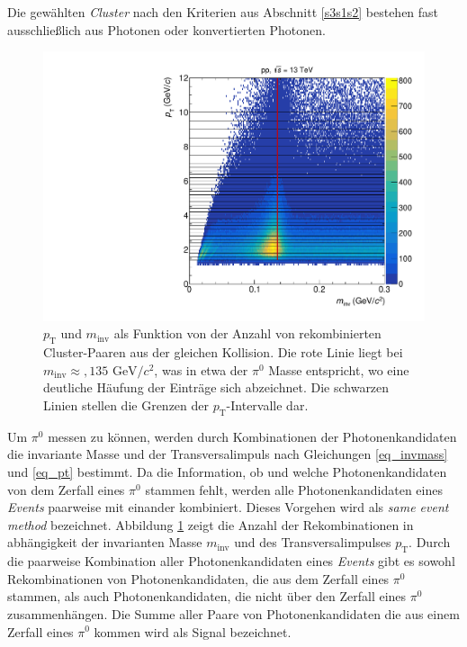 Die gew\"ahlten \textit{Cluster} nach den Kriterien aus Abschnitt \ref{s3s1s2} bestehen fast ausschlie{\ss}lich aus Photonen oder konvertierten Photonen.
\newline
\begin{figure}[tp]
\centering
\includegraphics[width=.7\linewidth]{hInvMass_pT_Signal.pdf}
\caption{$p_\text{T}$ und $m_\text{inv}$ als Funktion von der Anzahl von rekombinierten  Cluster-Paaren aus der gleichen Kollision.
Die rote Linie liegt bei $m_{\text{inv}}\approx,135\text{ GeV/}c^{2}$, was in etwa der $\pi^{0}$ Masse entspricht, wo eine deutliche H\"aufung der Eintr\"age sich abzeichnet.
Die schwarzen Linien stellen die Grenzen der $p_{\text{T}}$-Intervalle dar.}
\label{figInvMassPt_a}
\end{figure}
Um $\pi^{0}$ messen zu k\"onnen, werden durch Kombinationen der Photonenkandidaten die invariante Masse und der Transversalimpuls nach Gleichungen \ref{eq_invmass} und \ref{eq_pt} bestimmt.
Da die Information, ob und welche Photonenkandidaten von dem Zerfall eines $\pi^{0}$ stammen fehlt, werden alle Photonenkandidaten eines \textit{Events} paarweise mit einander kombiniert.
Dieses Vorgehen wird als \textit{same event method} bezeichnet.
Abbildung \ref{figInvMassPt_a} zeigt die Anzahl der Rekombinationen in abh\"angigkeit der invarianten Masse $m_{\text{inv}}$ und des Transversalimpulses $p_{\text{T}}$.
Durch die paarweise Kombination aller Photonenkandidaten eines \textit{Events} gibt es sowohl Rekombinationen von Photonenkandidaten, die aus dem Zerfall eines $\pi^{0}$ stammen, als auch Photonenkandidaten, die nicht \"uber den Zerfall eines $\pi^{0}$ zusammenh\"angen.
Die Summe aller Paare von Photonenkandidaten die aus einem Zerfall eines $\pi^{0}$ kommen wird als Signal bezeichnet.
